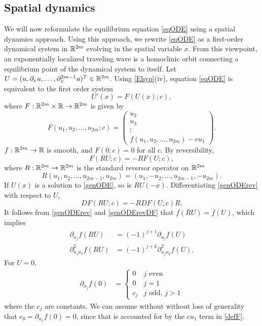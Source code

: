 \documentclass[11pt,reqno]{amsart}
\theoremstyle{plain}
\theoremstyle{definition}
\theoremstyle{remark}
\begin{document}
\subsection{Spatial dynamics}\label{sec:spatdym}

We will now reformulate the equilibrium equation \cref{eqODE} using a spatial dynamics approach. Using this approach, we rewrite \cref{eqODE} as a first-order dynamical system in $\mathbb{R}^{2m}$ evolving in the spatial variable $x$. From this viewpoint, an exponentially localized traveling wave is a homoclinic orbit connecting a equilibrium point of the dynamical system to itself. Let $U = (u, \partial_x u, \dots, \partial_x^{2m-1} u)^T \in \mathbb{R}^{2m}$. Using \cref{Ehyp}(iv), equation \cref{eqODE} is equivalent to the first order system
\begin{equation}\label{genODE}
U'(x) = F(U(x); c),
\end{equation}
where $F: \mathbb{R}^{2m} \times \mathbb{R} \rightarrow \mathbb{R}^{2m}$ is given by
\begin{equation}\label{defF}
F(u_1, u_2, \dots, u_{2m}; c) = 
\begin{pmatrix}
u_2 \\ u_3 \\ \vdots \\ f(u_1, u_2, \dots, u_{2m}) - c u_1
\end{pmatrix}.
\end{equation}
$f: \mathbb{R}^{2m} \rightarrow \mathbb{R}$ is smooth, and $F(0; c) = 0$ for all $c$. By reversibility,
\begin{equation}\label{genODErev}
F(RU; c) = -RF(U; c),
\end{equation}
where $R:\mathbb{R}^{2m} \rightarrow \mathbb{R}^{2m}$ is the standard reversor operator on $\mathbb{R}^{2m}$
\begin{equation}\label{reverserR2m}
R(u_1, u_2, \dots, u_{2m-1}, u_{2m}) = (u_1, -u_2, \dots, u_{2m-1}, -u_{2m}).
\end{equation}
If $U(x)$ is a solution to \cref{genODE}, so is $RU(-x)$. Differentiating \cref{genODErev} with respect to $U$,
\begin{equation}\label{genODErevDF}
D F(RU; c) = -RDF(U; c)R.
\end{equation}
It follows from \cref{genODErev} and \cref{genODErevDF} that $f(RU) = f(U)$, which implies
\begin{equation}\label{frev}
\begin{aligned}
\partial_{u_j} f(R U) &= (-1)^{j+1} \partial_{u_j} f(U) \\
\partial^2_{u_j u_k} f(R U) &= (-1)^{j+k} \partial^2_{u_j u_k} f(U).
\end{aligned}
\end{equation}
For $U = 0$,
\begin{align}\label{fpartials0}
\partial_{u_j} f(0) &= \begin{cases}
0 & j \text{ even}\\
0 & j = 1 \\
c_j & j \text{ odd, } j > 1
\end{cases}
\end{align}
where the $c_j$ are constants. We can assume without without loss of generality that $c_0 = \partial_{u_1} f(0) = 0$, since that is accounted for by the $c u_1$ term in \cref{defF}.
\end{document}
